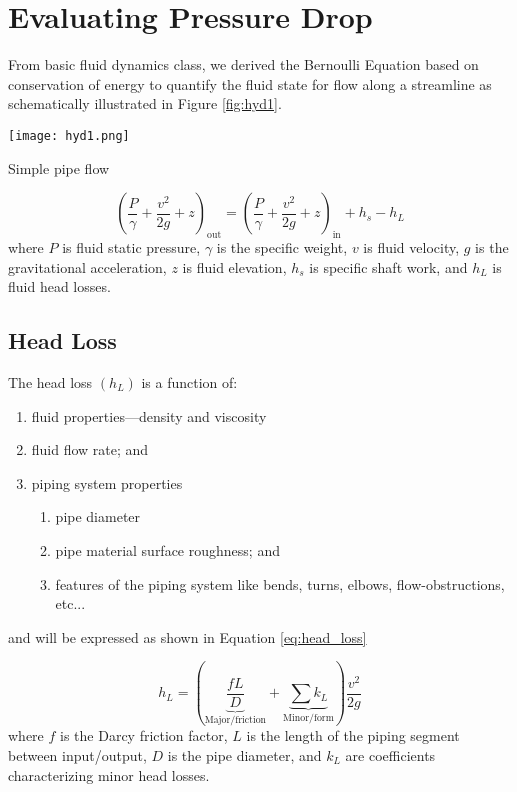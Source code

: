 \section{Evaluating Pressure Drop}
From basic fluid dynamics class, we derived the Bernoulli Equation based on conservation of energy to quantify the fluid state for flow along a streamline as schematically illustrated in Figure \ref{fig:hyd1}.
\begin{marginfigure}
\texttt{[image: hyd1.png]}
\caption{Simple pipe flow}
\label{fig:hyd1}
\end{marginfigure}

\begin{equation}
\left(\frac{P}{\gamma} + \frac{v^2}{2g}+z\right)_{\text{out}} = \left(\frac{P}{\gamma} + \frac{v^2}{2g}+z \right)_{\text{in}} + h_s - h_L
\end{equation}
where $P$ is fluid static pressure, $\gamma$ is the specific weight, $v$ is fluid velocity, $g$ is the gravitational acceleration, $z$ is fluid elevation, $h_s$ is specific shaft work, and $h_L$ is fluid head losses.

\subsection{Head Loss}
The head loss $(h_L)$ is a function of:
\begin{enumerate}
\item fluid properties---density and viscosity
\item fluid flow rate; and
\item piping system properties
\begin{enumerate}
\item pipe diameter
\item pipe material surface roughness; and
\item features of the piping system like bends, turns, elbows, flow-obstructions, etc...
\end{enumerate}
\end{enumerate}
and will be expressed as shown in Equation \ref{eq:head_loss}

\begin{equation}
h_{L} = \left(\underbrace{\frac{fL}{D}}_{\text{Major/friction}} + \underbrace{\sum k_L}_{\text{Minor/form}} \right)\frac{v^2}{2g}
\label{eq:head_loss}
\end{equation}
where $f$ is the Darcy friction factor, $L$ is the length of the piping segment between input/output, $D$ is the pipe diameter, and $k_{L}$ are coefficients characterizing minor head losses.

